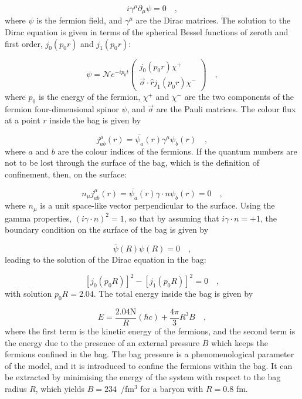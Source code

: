 \begin{equation*}
    i\gamma^\mu\partial_\mu\psi = 0\quad ,
\end{equation*}
where $\psi$ is the fermion field, and $\gamma^\mu$ are the Dirac matrices. The solution to the Dirac equation is given in terms of the spherical Bessel functions of zeroth and first order, $j_0(p_0r)$ and $j_1(p_0r)$:

\begin{equation*}
    \psi = \mathcal{N} e^{-ip_0t} \begin{pmatrix} j_0(p_0r)\chi^+ \\ \vec{\sigma}\cdot\hat{r}j_1(p_0r)\chi^-\end{pmatrix}\quad ,
\end{equation*}
where $p_0$ is the energy of the fermion, $\chi^+$ and $\chi^-$ are the two components of the fermion four-dimensional spinor $\psi$, and $\vec{\sigma}$ are the Pauli matrices. The colour flux at a point $r$ inside the bag is given by

\begin{equation*}
    j_{ab}^\mu(r) = \bar{\psi_a}(r)\gamma^\mu\psi_b(r)\quad ,
\end{equation*}
where $a$ and $b$ are the colour indices of the fermions. If the quantum numbers are not to be lost through the surface of the bag, which is the definition of confinement, then, on the surface:

\begin{equation*}
  n_\mu j_{ab}^\mu(r) = \bar{\psi_a}(r)\gamma\cdot n \psi_b(r) = 0\quad ,
\end{equation*}
 where $n_\mu$ is a unit space-like vector perpendicular to the surface. Using the gamma properties, $(i\gamma\cdot n)^2 = 1$, so that by assuming that $i\gamma\cdot n = + 1$, the boundary condition on the surface of the bag is given by

\begin{equation*}
    \bar{\psi}(R)\psi(R) = 0\quad ,
\end{equation*}
leading to the solution of the Dirac equation in the bag:

\begin{equation*}
    \left[j_0\left(p_0R\right)\right]^2 - \left[j_1\left(p_0R\right)\right]^2 = 0\quad ,
\end{equation*}
with solution $p_0R = 2.04$. The total energy inside the bag is given by

\begin{equation*}
    E = \frac{2.04 \mathrm{N}}{R}(\hbar c) + \frac{4\pi}{3}R^3B\quad ,
\end{equation*}
where the first term is the kinetic energy of the fermions, and the second term is the energy due to the presence of an external pressure $B$ which keeps the fermions confined in the bag. The bag pressure is a phenomenological parameter of the model, and it is introduced to confine the fermions within the bag. It can be extracted by minimising the energy of the system with respect to the bag radius $R$, which yields $B=234$~\mev/fm$^3$ for a baryon with $R=0.8$ fm.


